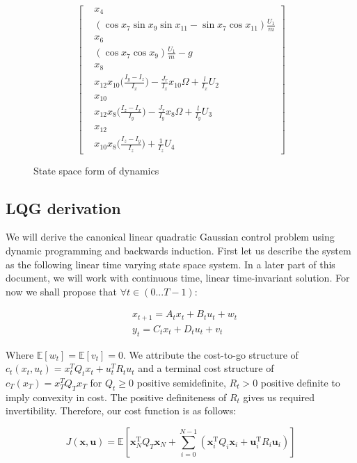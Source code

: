 \documentclass[conf]{new-aiaa}
\begin{document}
\begin{doublespace}
\begin{singlespace}
\begin{figure}
\begin{minipage}{.4\textwidth}
\[\begin{bmatrix}
        & x_4 \\
		&(\cos x_7\sin x_9\sin x_11 - \sin x_7\cos x_11)\frac{U_1}{m} \\
		& x_6 \\
		&(\cos x_7\cos x_9)\frac{U_1}{m} -g \\
		& x_8 \\
		&x_{12} x_{10}\Big(\frac{I_y - I_z}{I_x}\Big) - \frac{J_r}{I_x}x_{10}\Omega + \frac{l}{I_x}U_2\\
		& x_{10} \\
		&x_{12} x_8 \Big(\frac{I_z - I_x}{I_y}\Big) - \frac{J_r}{I_y}x_8 \Omega + \frac{l}{I_y}U_3 \\
		& x_{12} \\
		&x_{10} x_8\Big(\frac{I_z - I_y}{I_z}\Big)+ \frac{1}{I_z}U_4
	\end{bmatrix} \]
  \end{minipage}%
\end{figure}
\begin{figure}[!h]
	\caption{State space form of dynamics}
    \label{eq2}
\end{figure}
\end{singlespace}

\subsection{LQG derivation}
We will derive the canonical linear quadratic Gaussian control problem using dynamic programming and backwards induction. First let us describe the system as the following linear time varying state space system. In a later part of this document, we will work with continuous time, linear time-invariant solution. For now we shall propose that $\forall t \in (0 ...T-1)$:


\begin{singlespace}
\begin{align}
& x_{t+1} = A_t x_t + B_t u_t + w_t \\
& y_t = C_t x_t + D_t u_t + v_t
\label{eq3}
\end{align}
\end{singlespace}


Where $\mathbb{E}[w_t]=\mathbb{E}[v_t]=0$. We attribute the cost-to-go structure of $c_t(x_t,u_t) = x_t^T Q_t x_t + u_t^T R_t u_t$ and a terminal cost structure of $c_T(x_T)= x_T^T Q_T x_T$ for $Q_t \geq 0$ positive semidefinite, $R_t > 0$ positive definite to imply convexity in cost. The positive definiteness of $R_t$ gives us required invertibility. Therefore, our cost function is as follows: 
\begin{singlespace}
\begin{equation}
{{\displaystyle J(\mathbf{x},\mathbf{u})=\mathbb {E} \left[{\mathbf {x} }_{N}^{\mathrm {T} }Q_T{\mathbf {x} }_{N}+\sum _{i=0}^{N-1}(\mathbf {x} _{i}^{\mathrm {T} }Q_{i}\mathbf {x} _{i}+\mathbf {u} _{i}^{\mathrm {T} }R_{i}\mathbf {u} _{i})\right]}}
\end{equation}
\end{singlespace}


\end{doublespace}
\end{document}
